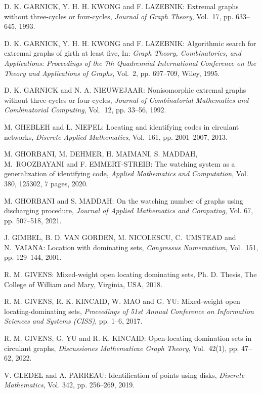 \begin{thebibliography}{999}
D. K. GARNICK, Y. H. H. KWONG and F. LAZEBNIK: Extremal graphs without three-cycles or four-cycles, {\it Journal of Graph Theory}, Vol.~17, pp. 633--645, 1993.

D. K. GARNICK, Y. H. H. KWONG and F. LAZEBNIK: Algorithmic search for extremal graphs of girth at least five, In: {\it Graph Theory, Combinatorics, and Applications: Proceedings of the 7th Quadrennial International Conference on the Theory and Applications of Graphs}, Vol.~2, pp. 697--709, Wiley, 1995.

D. K. GARNICK and N. A. NIEUWEJAAR: Nonisomorphic extremal graphs without three-cycles or four-cycles, {\it Journal of Combinatorial Mathematics and Combinatorial Computing}, Vol.~12, pp. 33--56, 1992.

M. GHEBLEH and L. NIEPEL: Locating and identifying codes in circulant networks, {\it Discrete Applied Mathematics}, Vol.~161, pp. 2001--2007, 2013.

M. GHORBANI, M. DEHMER, H. MAIMANI, S. MADDAH, M.~ROOZ\-BAYANI and F. EMMERT-STREIB: The watching system as a generalization of identifying code, {\it Applied Mathematics and Computation}, Vol. 380, 125302, 7 pages, 2020.

M. GHORBANI and S. MADDAH: On the watching number of graphs using discharging procedure, {\it Journal of Applied Mathematics and Computing}, Vol. 67, pp. 507--518, 2021.

J. GIMBEL, B. D. VAN GORDEN, M. NICOLESCU, C.~UMSTEAD and N.~VAIANA: Location with dominating sets, {\it Congressus Numerantium}, Vol.~151, pp. 129--144, 2001.

R. M. GIVENS: Mixed-weight open locating dominating sets, Ph. D. Thesis, The College of William and Mary, Virginia, USA, 2018.

R. M. GIVENS, R. K. KINCAID, W. MAO and G. YU: Mixed-weight open locating-dominating sets, {\it Proceedings of 51st Annual Conference on Information Sciences and Systems (CISS)}, pp. 1--6, 2017.

R. M. GIVENS, G. YU and R. K. KINCAID: Open-locating domination sets in
circulant graphs, {\it Discussiones Mathematicae Graph Theory}, Vol.~42(1), pp. 47--62, 2022.

V. GLEDEL and A. PARREAU: Identification of points using disks, {\it Discrete Mathematics}, Vol. 342, pp. 256--269, 2019.


\end{thebibliography}
